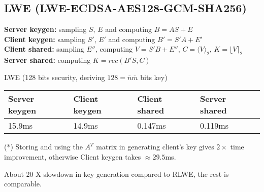 \documentclass[12pt]{article}
\newcommand{\nbar}{\overline{n}}
\newcommand{\mbar}{\overline{m}}
\begin{document}
\subsection{LWE \tiny{(LWE-ECDSA-AES128-GCM-SHA256)}}

\footnotesize{\textbf{Server keygen:} sampling $S$, $E$ and computing $B = AS + E$\\
\textbf{Client keygen:} sampling $S'$, $E'$ and computing $B' = S'A + E'$\\
\textbf{Client shared:} sampling $E''$, computing $V = S'B + E''$, $C = \langle V \rangle_2$, $K = \lfloor V \rceil_2$\\
\textbf{Server shared:} computing $K = rec(B'S, C)$\\}
\normalsize

LWE (128 bits security, deriving $128 = \nbar \mbar$ bits key)
\begin{center}
    \begin{tabular}{| l | l | l | l |}
    \hline
    Server keygen & Client keygen & Client shared & Server shared \\ \hline
    15.9ms &   14.9ms &   0.147ms &   0.119ms \\ \hline
    \end{tabular}
\end{center}

\footnotesize (*) Storing and using the $A^T$ matrix in generating client's key gives $2\times$ time improvement, otherwise Client keygen takes $\approx 29.5$ms.
\normalsize

About 20 X slowdown in key generation compared to RLWE, the rest is comparable.

\end{document}
